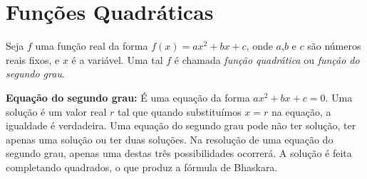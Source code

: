 \section{Funções Quadráticas}

Seja $f$ uma função real  da forma $f(x)=ax^2+bx+c$, onde $a$,$b$ e $c$ são números reais fixos, e $x$ é a variável. Uma tal $f$ é chamada \textit{função quadrática} ou
\textit{função do segundo grau}.

\noindent\textbf{Equação do segundo grau:} É uma equação da forma $ax^2+bx+c=0$. Uma solução é um valor real $r$ tal que quando substituímos $x=r$ na equação, a igualdade é verdadeira. Uma equação
do segundo grau pode não ter solução, ter apenas uma solução ou ter duas soluções. Na resolução de uma equação do segundo grau, apenas uma destas três possibilidades ocorrerá. A solução é feita completando quadrados,
o que produz a fórmula de Bhaskara.

